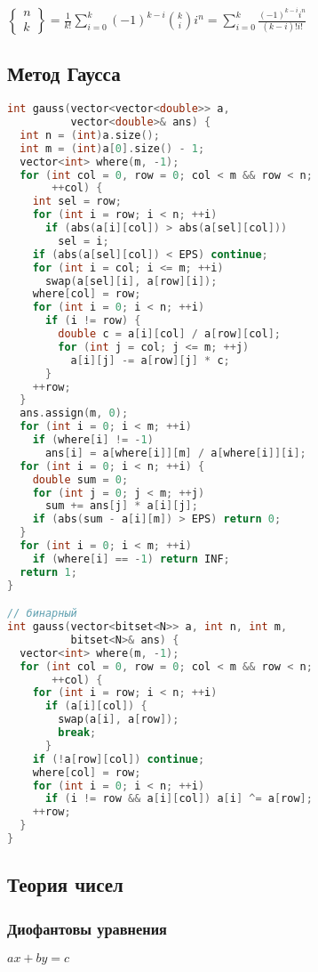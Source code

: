 \documentclass[10pt,a4paper,landscape,twosided]{extarticle}
\begin{document}
\begin{multicols}{3}
$\begin{Bmatrix}
    n \\ k
\end{Bmatrix}=\frac{1}{k!}\sum\limits_{i=0}^k(-1)^{k-i}\binom{k}{i}i^n=\sum\limits_{i=0}^k\frac{(-1)^{k-i}i^n}{(k-i)!i!}$

\subsection{Метод Гаусса}
\begin{lstlisting}[language=C++]
int gauss(vector<vector<double>> a,
          vector<double>& ans) {
  int n = (int)a.size();
  int m = (int)a[0].size() - 1;
  vector<int> where(m, -1);
  for (int col = 0, row = 0; col < m && row < n;
       ++col) {
    int sel = row;
    for (int i = row; i < n; ++i)
      if (abs(a[i][col]) > abs(a[sel][col]))
        sel = i;
    if (abs(a[sel][col]) < EPS) continue;
    for (int i = col; i <= m; ++i)
      swap(a[sel][i], a[row][i]);
    where[col] = row;
    for (int i = 0; i < n; ++i)
      if (i != row) {
        double c = a[i][col] / a[row][col];
        for (int j = col; j <= m; ++j)
          a[i][j] -= a[row][j] * c;
      }
    ++row;
  }
  ans.assign(m, 0);
  for (int i = 0; i < m; ++i)
    if (where[i] != -1)
      ans[i] = a[where[i]][m] / a[where[i]][i];
  for (int i = 0; i < n; ++i) {
    double sum = 0;
    for (int j = 0; j < m; ++j)
      sum += ans[j] * a[i][j];
    if (abs(sum - a[i][m]) > EPS) return 0;
  }
  for (int i = 0; i < m; ++i)
    if (where[i] == -1) return INF;
  return 1;
}

// бинарный
int gauss(vector<bitset<N>> a, int n, int m,
          bitset<N>& ans) {
  vector<int> where(m, -1);
  for (int col = 0, row = 0; col < m && row < n;
       ++col) {
    for (int i = row; i < n; ++i)
      if (a[i][col]) {
        swap(a[i], a[row]);
        break;
      }
    if (!a[row][col]) continue;
    where[col] = row;
    for (int i = 0; i < n; ++i)
      if (i != row && a[i][col]) a[i] ^= a[row];
    ++row;
  }
}\end{lstlisting}

\subsection{Теория чисел}

\subsubsection{Диофантовы уравнения}
$ax + by = c$


\end{multicols}
\end{document}
